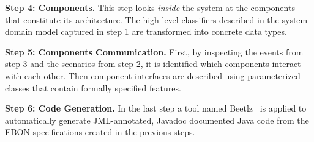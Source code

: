 \documentclass[letterpaper,conference]{IEEEtran}
\begin{document}
%
{\bf Step 4: Components.}
This step looks \emph{inside} the system at the components that constitute
its architecture. The high
level classifiers described in
the system domain model captured in step 1 are transformed into concrete
data types. 
%

%
{\bf Step 5: Components Communication.}
First, by inspecting the events from step 3 and the scenarios from step 2,
it is identified which components interact with each other. 
Then component interfaces are described using parameterized classes that 
contain formally specified features. 
%


%

%
{\bf Step 6: Code Generation.}
In the last step a tool named Beetlz~\cite{Darulova09} is applied to 
automatically generate JML-annotated, Javadoc documented Java code 
from the EBON specifications created in the previous steps. 
\end{document}
